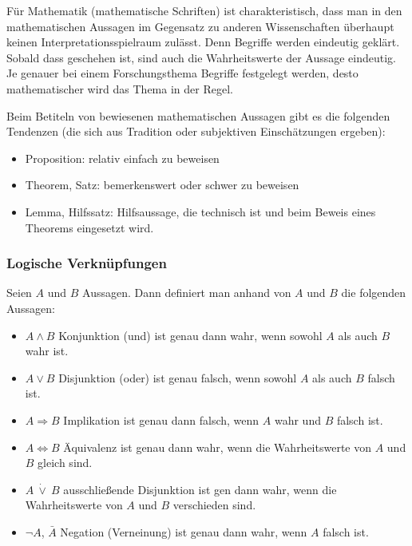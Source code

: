 Für Mathematik (mathematische Schriften) ist charakteristisch, dass man in den mathematischen Aussagen im Gegensatz zu anderen Wissenschaften überhaupt keinen Interpretationsspielraum zulässt. Denn Begriffe werden eindeutig geklärt. Sobald dass geschehen ist, sind auch die Wahrheitswerte der Aussage eindeutig. Je genauer bei einem Forschungsthema Begriffe festgelegt werden, desto mathematischer wird das Thema in der Regel. 


\begin{bem} Beim Betiteln von bewiesenen mathematischen Aussagen gibt es die folgenden Tendenzen (die sich aus Tradition oder subjektiven Einschätzungen ergeben):
	\begin{itemize}
		\item Proposition: relativ einfach zu beweisen 
		\item Theorem, Satz: bemerkenswert oder schwer zu beweisen
		\item Lemma, Hilfssatz:  Hilfsaussage, die  technisch  ist und beim Beweis eines Theorems eingesetzt wird. 
	\end{itemize}
\end{bem}


\subsubsection{Logische Verknüpfungen}

Seien $ A $ und $ B $ Aussagen. Dann definiert man anhand von $ A $ und $ B $ die folgenden Aussagen:
\begin{itemize}
	\item $ A \wedge B $ Konjunktion (\glqq und\grqq) ist genau dann wahr, wenn sowohl $A$ als auch $B$ wahr ist. 
	\item $ A \vee B $ Disjunktion (\glqq oder\grqq) ist genau falsch, wenn sowohl $A$ als auch $B$ falsch ist. 
	\item $ A \Rightarrow B $ Implikation ist genau dann falsch, wenn $A$ wahr und $B$ falsch ist. 
	\item $ A \Leftrightarrow B $ Äquivalenz ist genau dann wahr, wenn die Wahrheitswerte von $A$ und $B$ gleich sind. 
	\item $ A \:\dot{\vee}\: B $ ausschließende Disjunktion ist gen dann wahr, wenn die Wahrheitswerte von $A$ und $B$ verschieden sind. 
	\item $ \neg A $, $ \bar{A} $ Negation (Verneinung) ist genau dann wahr, wenn $A$ falsch ist. 
\end{itemize}

